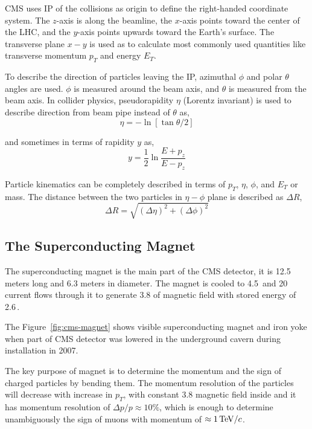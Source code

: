 CMS uses \gls{IP} of the collisions as origin to define the right-handed
coordinate system. The \( z \)-axis is along the beamline,
the \( x \)-axis points toward the center of the \gls{LHC},
and the \( y \)-axis points upwards toward the Earth's surface.
The transverse plane \( x - y \) is used as to calculate
most commonly used quantities like transverse momentum \( p_{T} \)
and energy \( E_{T} \).

To describe the direction of particles leaving the \gls{IP},
azimuthal \( \phi \) and polar \( \theta \) angles are used.
\( \phi \) is measured around the beam axis,
and \( \theta \) is measured from the beam axis.
In collider physics, pseudorapidity \( \eta \) (Lorentz invariant) is used
to describe direction from beam pipe instead of \( \theta \) as,
%
\begin{equation}
  \eta = - \ln[\tan{\theta/2}]
\end{equation}

and sometimes in terms of rapidity \( y \) as,
%
\begin{equation}
  y = \frac{1}{2} \ln{\frac{E+p_{z}}{E-p_{z}}}
\end{equation}

Particle kinematics can be completely described in terms of
\( p_{T} \), \( \eta \), \( \phi \), and \( E_{T} \) or mass.
The distance between the two particles in \( \eta - \phi \) plane
is described as \( \Delta R \),
%
\begin{equation}
  \Delta R = \sqrt{ {(\Delta \eta)}^{2} + {(\Delta \phi)}^{2} }
\end{equation}

\subsection{
  The Superconducting Magnet
}

The superconducting magnet is the main part of the \gls{CMS} detector, it is
12.5 meters long and 6.3 meters in diameter. The magnet is cooled to
4.5\,\xspace and 20\,\xspace current flows through it to
generate 3.8\Tesla{} of magnetic field with stored energy of 2.6\,\xspace.

The Figure~\ref{fig:cms-magnet} shows visible superconducting magnet
and iron yoke when part of \gls{CMS} detector was lowered in the underground
cavern during installation in 2007.

The key purpose of magnet is to determine the momentum and the sign of charged
particles by bending them. The momentum resolution of the particles will
decrease with increase in \(p_T \), with constant 3.8\Tesla{} magnetic field
inside and it has momentum resolution of \(\Delta p /p \approx 10 \% \), which
is enough to determine unambiguously the sign of muons with
momentum of \(\approx 1\,\text{Te\hspace{-.08em}V}{}/c \).

